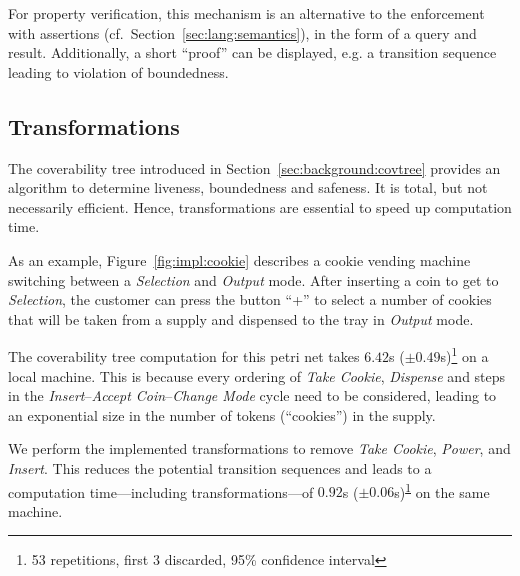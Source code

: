 For property verification, this mechanism is an alternative to the enforcement with assertions (cf.\ Section~\ref{sec:lang:semantics}), in the form of a query and result. Additionally, a short ``proof'' can be displayed, e.g. a transition sequence leading to violation of boundedness.

\subsection{Transformations}\label{sec:impl:speed}

The coverability tree introduced in Section~\ref{sec:background:covtree} provides an algorithm to determine liveness, boundedness and safeness. It is total, but not necessarily efficient. Hence, transformations are essential to speed up computation time.

As an example, Figure~\ref{fig:impl:cookie} describes a cookie vending machine switching between a \emph{Selection} and \emph{Output} mode. After inserting a coin to get to \emph{Selection}, the customer can press the button ``+'' to select a number of cookies that will be taken from a supply and dispensed to the tray in \emph{Output} mode.

The coverability tree computation for this petri net takes $6.42$s ($\pm0.49$s)\footnote{\label{fn:experiment}53 repetitions, first 3 discarded, 95\% confidence interval} on a local machine. This is because every ordering of \emph{Take Cookie}, \emph{Dispense} and steps in the \emph{Insert}--\emph{Accept Coin}--\emph{Change Mode} cycle need to be considered, leading to an exponential size in the number of tokens (``cookies'') in the supply.

We perform the implemented transformations to remove \emph{Take Cookie}, \emph{Power}, and \emph{Insert}. This reduces the potential transition sequences and leads to a computation time---including transformations---of $0.92$s ($\pm0.06$s)\textsuperscript{\ref{fn:experiment}} on the same machine.

